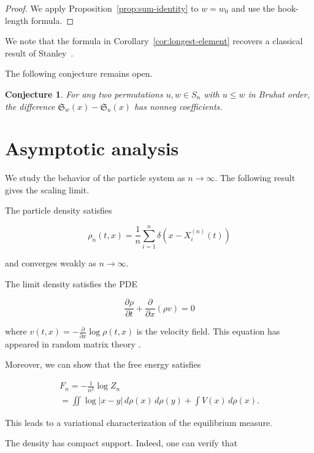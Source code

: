 \documentclass{amsart}
\theoremstyle{plain}
\newtheorem{conjecture}[theorem]{Conjecture}
\theoremstyle{definition}
\theoremstyle{remark}
\begin{document}
\begin{proof}
We apply Proposition~\ref{prop:sum-identity} to $w = w_0$ and use
the hook-length formula.
\end{proof}

We note that the formula in Corollary~\ref{cor:longest-element}   
recovers a classical result of Stanley~\cite{Stanley1984}.

The following conjecture remains open.
\begin{conjecture}
\label{conj:positivity}
For any two permutations $u, w \in S_n$ with $u \leq w$ in Bruhat order,
the difference $\mathfrak{S}_w(x) - \mathfrak{S}_u(x)$ has nonneg
coefficients.
\end{conjecture}

\section{Asymptotic analysis}
\label{sec:asymptotics}

We study the behavior of the particle system as $n \to \infty$.
The following result gives the scaling limit.

The particle density satisfies

$$
\rho_n(t, x) = \frac{1}{n} \sum_{i=1}^{n} \delta(x - X_i^{(n)}(t))
$$

and converges weakly as $n \to \infty$.

The limit density satisfies the PDE

\begin{equation}
\label{eq:pde}
\frac{\partial \rho}{\partial t} + \frac{\partial}{\partial x}(\rho v) = 0
\end{equation}

where $v(t,x) = -\frac{\partial}{\partial x} \log \rho(t,x)$ is the velocity
field. This equation has appeared in random matrix theory \cite{AGZ2010}.   

Moreover, we can show that the free energy satisfies

\begin{gather}
\label{eq:free-energy-a}
F_n = -\frac{1}{n^2} \log Z_n \\
\label{eq:free-energy-b}
= \iint \log|x - y|\, d\rho(x)\, d\rho(y) + \int V(x)\, d\rho(x).
\end{gather}

This leads to a variational characterization of the equilibrium measure.

The density has compact support. Indeed, one can verify that
\end{document}
